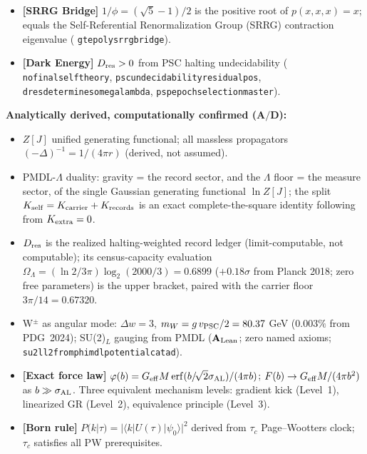 \documentclass[11pt]{article}
\theoremstyle{remark}
\newcommand{\ZSstar}{\mathbb{Z}_7^*}
\newcommand{\lean}[1]{%
  \penalty-100
  \begingroup\def\_{\textunderscore\allowbreak}\texttt{#1}\endgroup}
\newcommand{\OmegaL}{\Omega_\Lambda}
\newcommand{\CatAL}{\ensuremath{\textbf{A}_{\rm Lean}}}
\newcommand{\CatAD}{\textbf{A/D}}
\begin{document}
\begin{tcolorbox}[colback=orange!6,colframe=orange!70!black,
  title={\textbf{What this paper claims and does not claim}},
  fonttitle=\bfseries,left=6pt,right=6pt,top=5pt,bottom=5pt]
\begin{itemize}[noitemsep,topsep=2pt]
        roots of $\ZSstar$; sector $\{3\}$ is the unique primitive root
        (\lean{gte\_winding\_identifies\_charged\_fermions}).
  \item \textbf{[SRRG Bridge]} $1/\phi=(\sqrt{5}-1)/2$ is the positive root of
        $p(x,x,x)=x$; equals the Self-Referential Renormalization Group (SRRG) contraction eigenvalue
        (\lean{gte\_poly\_srrg\_bridge}).
  \item \textbf{[Dark Energy]} $D_{\rm res}>0$ from PSC halting undecidability
        (\lean{no\_final\_self\_theory}, \lean{psc\_undecidability\_residual\_pos},
        \lean{d\_res\_determines\_omega\_lambda}, \lean{psp\_epoch\_selection\_master}).
\end{itemize}
\textbf{Analytically derived, computationally confirmed ($\CatAD$):}
\begin{itemize}[noitemsep,topsep=2pt]
  \item $Z[J]$ unified generating functional; all massless propagators
        $(-\Delta)^{-1}=1/(4\pi r)$ (derived, not assumed).
  \item PMDL-$\Lambda$ duality: gravity = the record sector, and the $\Lambda$
        floor = the measure sector, of the single Gaussian generating
        functional $\ln Z[J]$; the split
        $K_{\rm self} = K_{\rm carrier} + K_{\rm records}$ is an exact
        complete-the-square identity following from $K_{\rm extra}=0$.
  \item $D_{\rm res}$ is the realized halting-weighted record ledger
        (limit-computable, not computable); its census-capacity evaluation
        $\OmegaL = (\ln 2/3\pi)\log_2(2000/3) = 0.6899$ ($+0.18\sigma$
        from Planck 2018; zero free parameters) is the upper bracket, paired
        with the carrier floor $3\pi/14 = 0.67320$.
  \item W$^\pm$ as angular mode: $\Delta w = 3$, $m_W = g\,v_{\rm PSC}/2 = 80.37$ GeV
        ($0.003\%$ from PDG~2024); SU(2)$_L$ gauging from PMDL
        ($\CatAL$; zero named axioms; \lean{su2l\_l2\_from\_phimdl\_potential\_catad}).
  \item \textbf{[Exact force law]} $\varphi(b) = G_{\rm eff}M\,\mathrm{erf}(b/\!\sqrt{2}\sigma_{\rm AL})/(4\pi b)$;
        $F(b) \to G_{\rm eff}M/(4\pi b^2)$ as $b\gg\sigma_{\rm AL}$.
        Three equivalent mechanism levels: gradient kick (Level~1), linearized GR (Level~2),
        equivalence principle (Level~3).
  \item \textbf{[Born rule]} $P(k|\tau) = |\langle k|U(\tau)|\psi_0\rangle|^2$ derived from
        $\tau_c$ Page--Wootters clock; $\tau_c$ satisfies all PW prerequisites.

\end{itemize}
\end{tcolorbox}
\end{document}
